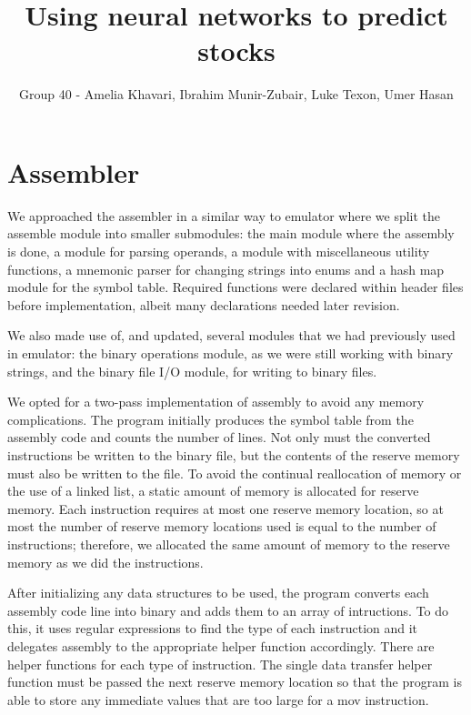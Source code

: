 \documentclass[11pt]{article}
\begin{document}
\title{Using neural networks to predict stocks}
\author{Group 40 - Amelia Khavari, Ibrahim Munir-Zubair, Luke Texon, Umer Hasan}

\maketitle

\section{Assembler}
We approached the assembler in a similar way to emulator where we split the 
assemble module into smaller submodules: the main module where the assembly is done, 
a module for parsing operands, a module with miscellaneous utility functions, 
a mnemonic parser for changing strings into enums and 
a hash map module for the symbol table. Required functions were declared  within header files 
before implementation, albeit many declarations needed later revision.

We also made use of, and updated, several modules that we had previously used in emulator: 
the binary operations module, as we were still working with binary strings, 
and the binary file I/O module, for writing to binary files.     

We opted for a two-pass implementation of assembly to avoid any memory complications.
The program initially produces the symbol table from the assembly code and counts the number of lines.
Not only must the converted instructions be written to the binary file, but the contents of the reserve memory
must also be written to the file. To avoid the continual reallocation of memory or the use of a linked list, 
a static amount of memory is allocated for reserve memory. 
Each instruction requires at most one reserve memory location, so at most the number of 
reserve memory locations used is equal to the number of instructions; therefore, we allocated the 
same amount of memory to the reserve memory as we did the instructions.

After initializing any data structures to be used, the program converts each assembly 
code line into binary and adds them to an array of intructions. 
To do this, it uses regular expressions to find the type of each instruction and
it delegates assembly to the appropriate helper function accordingly.
There are helper functions for each type of instruction. The single data transfer helper function 
must be passed the next reserve memory location 
so that the program is able to store any immediate values that are too large for a mov instruction.
\end{document}
